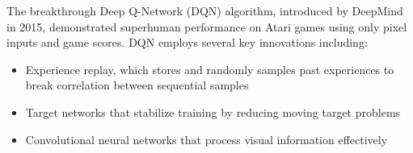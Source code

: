 The breakthrough Deep Q-Network (DQN) algorithm, introduced by DeepMind in 2015, demonstrated superhuman performance on Atari games using only pixel inputs and game scores. DQN employs several key innovations including:
\begin{itemize}
    \item Experience replay, which stores and randomly samples past experiences to break correlation between sequential samples
    \item Target networks that stabilize training by reducing moving target problems
    \item Convolutional neural networks that process visual information effectively
\end{itemize}
